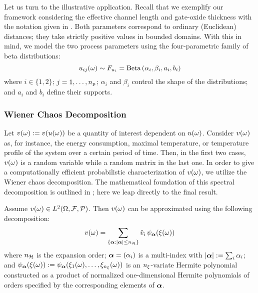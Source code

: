 Let us turn to the illustrative application.
Recall that we exemplify our framework considering the effective channel length and gate-oxide thickness with the notation given in .
Both parameters correspond to ordinary (Euclidean) distances; they take strictly positive values in bounded domains.
With this in mind, we model the two process parameters using the four-parametric family of beta distributions:
\begin{equation*}
  u_{ij}(\omega) \sim F_{u_i} = \text{Beta}\left( \alpha_i, \beta_i, a_i, b_i \right)
\end{equation*}
where $i \in \{ 1, 2 \}$; $j = 1, \dots, {n_\text{p}}$; $\alpha_i$ and $\beta_i$ control the shape of the distributions; and $a_i$ and $b_i$ define their supports.

\subsubsection{Wiener Chaos Decomposition}
Let $v(\omega) := v(u(\omega))$ be a quantity of interest dependent on $u(\omega)$.
Consider $v(\omega)$ as, for instance, the energy consumption, maximal temperature, or temperature profile of the system over a certain period of time.
Then, in the first two cases, $v(\omega)$ is a random variable while a random matrix in the last one.
In order to give a computationally efficient probabilistic characterization of $v(\omega)$, we utilize the Wiener chaos decomposition.
The mathematical foundation of this spectral decomposition is outlined in ; here we leap directly to the final result.

Assume $v(\omega) \in L^{2}(\Omega, \mathcal{F}, \mathcal{P})$.
Then $v(\omega)$ can be approximated using the following decomposition:
\begin{equation} \elab{polynomial-chaos-expansion}
  \w(\o) = \sum_{\{\multiindex: |\multiindex| \leq \ncorder\}} \coefficient{\w}_i \, \polynomial_{\multiindex}(\z(\o))
\end{equation}
where ${n_{\mathcal{H}}}$ is the expansion order; ${\boldsymbol \alpha} = (\alpha_i)$ is a multi-index with $|{\boldsymbol \alpha}| := \sum_i \alpha_i$; and $\psi_{{\boldsymbol \alpha}}(\xi(\omega)) := \psi_{{\boldsymbol \alpha}}(\xi_1(\omega), \dots, \xi_{n_\xi}(\omega))$ is an ${n_\xi}$-variate Hermite polynomial constructed as a product of normalized one-dimensional Hermite polynomials of orders specified by the corresponding elements of ${\boldsymbol \alpha}$.


